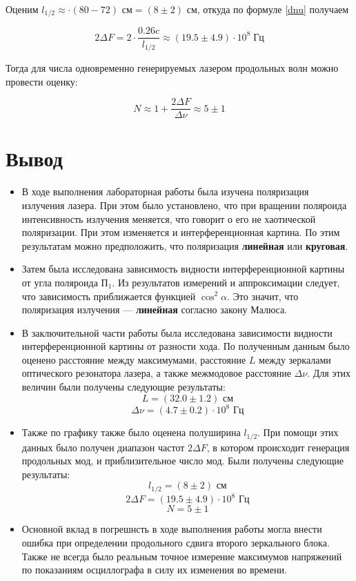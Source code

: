 \documentclass[12pt,a4paper]{article}
\begin{document}
    Оценим $ l_{1/2} \approx \cdot(80 - 72) \text{ см} = (8 \pm 2) \text{ см} $, откуда по формуле \eqref{dnu} получаем
    
    \begin{equation}\label{}
    2\Delta F = 2\cdot \dfrac{0.26 c}{l_{1/2}} \approx (19.5 \pm 4.9) \cdot 10^8 \; \text{Гц}
    \end{equation}
    
    Тогда для числа одновременно генерируемых лазером продольных волн можно провести оценку:
    
    \begin{equation}\label{}
    N \approx 1 + \dfrac{ 2\Delta F}{\Delta \nu} \approx 5 \pm 1
    \end{equation}

	\vfill
	\section*{Вывод}
    \begin{itemize}
        \item В ходе выполнения лабораторная работы была изучена поляризация излучения лазера. При этом было установлено, что при вращении поляроида интенсивность излучения меняется, что говорит о его не хаотической поляризации. При этом изменяется и интерференционная картина. По этим результатам можно предположить, что поляризация \textbf{линейная} или \textbf{круговая}.
        \item Затем была исследована зависимость видности интерференционной картины от угла поляроида $ \text{П}_1 $. Из результатов измерений и аппроксимации следует, что зависимость приближается функцией $ \cos^2 \alpha $. Это значит, что поляризация излучения --- \textbf{линейная} согласно закону Малюса.
        \item В заключительной части работы была исследована зависимости видности интерференционной картины от разности хода. По полученным данным было оценено расстояние между максимумами, расстояние $ L $ между зеркалами оптического резонатора лазера, а также межмодовое расстояние $ \Delta\nu $. Для этих величин были получены следующие результаты:
        \[ \boxed{L = (32.0 \pm 1.2) \text{ см}} \]
        \[ \boxed{\Delta\nu = (4.7 \pm 0.2) \cdot 10^8 \text{ Гц}} \]
        \item Также по графику также было оценена полуширина $ l_{1/2} $. При помощи этих данных было получен диапазон частот $ 2\Delta F $, в котором происходит генерация продольных мод, и приблизительное число мод. Были получены следующие результаты:
        \[ \boxed{l_{1/2} = (8 \pm 2) \text{ см}} \]
        \[ \boxed{2\Delta F = (19.5 \pm 4.9)\cdot 10^8 \text{ Гц}} \]
        \[ \boxed{N = 5 \pm 1} \]
        \item Основной вклад в погрешнсть в ходе выполнения работы могла внести ошибка при определении продольного сдвига второго зеркального блока. Также не всегда было реальным точное измерение максимумов напряжений по показаниям осциллографа в силу их изменения во времени.
    \end{itemize}
\end{document}
